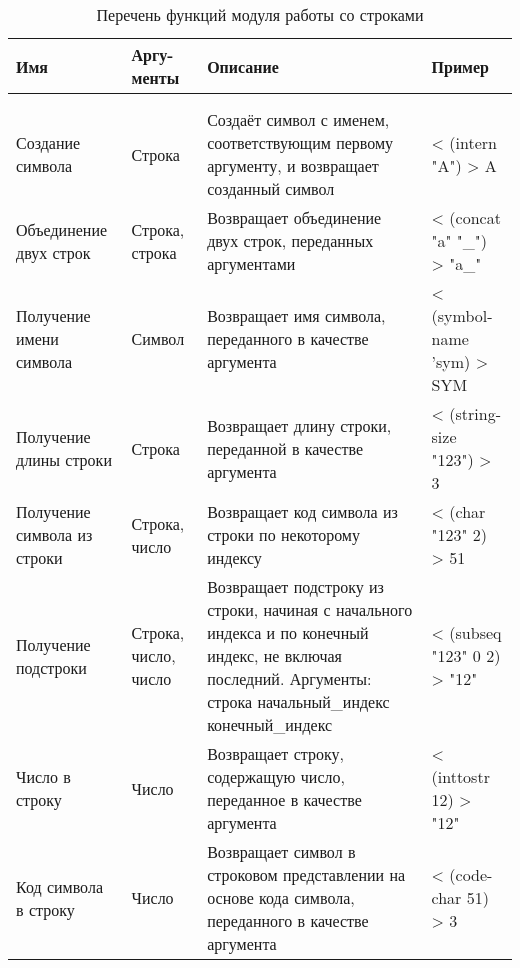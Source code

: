 \begin{xltabular}{\textwidth}{|p{3.6cm}|p{1.8cm}|p{6cm}|X|}
	\caption{Перечень функций модуля работы со строками\label{funcprimstr:table}}\\ \hline
	\centrow Имя & \centrow Аргу- \linebreak менты & \centrow Описание & \centrow Пример \\ \hline
	 &  &  &  \\ \hline
	\endfirsthead
	 &  &  &  \\ \hline
	\finishhead
	Создание символа & Строка & Создаёт символ с именем, соответствующим первому аргументу, и возвращает созданный символ & < (intern "A") \linebreak > A \\ \hline 
	Объединение двух строк & Строка, строка & Возвращает объединение двух строк, переданных аргументами & < (concat "a" "\_") \linebreak > "a\_" \\ \hline 
	Получение имени символа & Символ & Возвращает имя символа, переданного в качестве аргумента & < (symbol-name 'sym) \linebreak > SYM \\ \hline 
	Получение длины строки & Строка & Возвращает длину строки, переданной в качестве аргумента & < (string-size "123") \linebreak > 3 \\ \hline 
	Получение символа из строки & Строка, число & Возвращает код символа из строки по некоторому индексу & < (char "123" 2) \linebreak > 51 \\ \hline 
	Получение подстроки & Строка, число, число & Возвращает подстроку из строки, начиная с начального индекса и по конечный индекс, не включая последний. Аргументы: строка начальный\_индекс конечный\_индекс & < (subseq "123" 0 2) \linebreak > "12" \\ \hline 
	Число в строку & Число & Возвращает строку, содержащую число, переданное в качестве аргумента & < (inttostr 12) \linebreak > "12" \\ \hline 
	Код символа в строку & Число & Возвращает символ в строковом представлении на основе кода символа, переданного в качестве аргумента & < (code-char 51) \linebreak > 3
	
\end{xltabular}